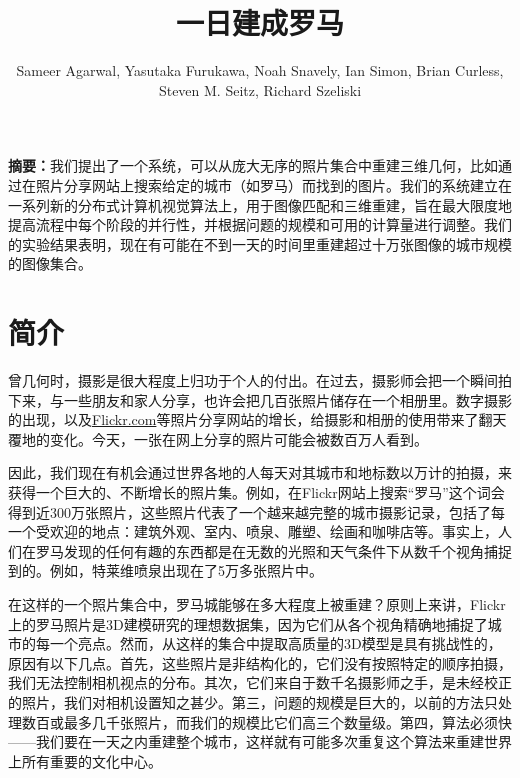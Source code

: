 
\begin{translation}
\label{cha:translation}

\title{一日建成罗马}
\author{Sameer Agarwal, Yasutaka Furukawa, Noah Snavely, Ian Simon, Brian Curless, Steven M. Seitz, Richard Szeliski}
\maketitle
\tableofcontents

\textbf{摘要：}我们提出了一个系统，可以从庞大无序的照片集合中重建三维几何，比如通过在照片分享网站上搜索给定的城市（如罗马）而找到的图片。我们的系统建立在一系列新的分布式计算机视觉算法上，用于图像匹配和三维重建，旨在最大限度地提高流程中每个阶段的并行性，并根据问题的规模和可用的计算量进行调整。我们的实验结果表明，现在有可能在不到一天的时间里重建超过十万张图像的城市规模的图像集合。

\section{简介}
曾几何时，摄影是很大程度上归功于个人的付出。在过去，摄影师会把一个瞬间拍下来，与一些朋友和家人分享，也许会把几百张照片储存在一个相册里。数字摄影的出现，以及\href{https://www.flickr.com}{Flickr.com}等照片分享网站的增长，给摄影和相册的使用带来了翻天覆地的变化。今天，一张在网上分享的照片可能会被数百万人看到。

因此，我们现在有机会通过世界各地的人每天对其城市和地标数以万计的拍摄，来获得一个巨大的、不断增长的照片集。例如，在Flickr网站上搜索“罗马”这个词会得到近300万张照片，这些照片代表了一个越来越完整的城市摄影记录，包括了每一个受欢迎的地点：建筑外观、室内、喷泉、雕塑、绘画和咖啡店等。事实上，人们在罗马发现的任何有趣的东西都是在无数的光照和天气条件下从数千个视角捕捉到的。例如，特莱维喷泉出现在了5万多张照片中。

在这样的一个照片集合中，罗马城能够在多大程度上被重建？原则上来讲，Flickr上的罗马照片是3D建模研究的理想数据集，因为它们从各个视角精确地捕捉了城市的每一个亮点。然而，从这样的集合中提取高质量的3D模型是具有挑战性的，原因有以下几点。首先，这些照片是非结构化的，它们没有按照特定的顺序拍摄，我们无法控制相机视点的分布。其次，它们来自于数千名摄影师之手，是未经校正的照片，我们对相机设置知之甚少。第三，问题的规模是巨大的，以前的方法只处理数百或最多几千张照片，而我们的规模比它们高三个数量级。第四，算法必须快——我们要在一天之内重建整个城市，这样就有可能多次重复这个算法来重建世界上所有重要的文化中心。


\end{translation}
